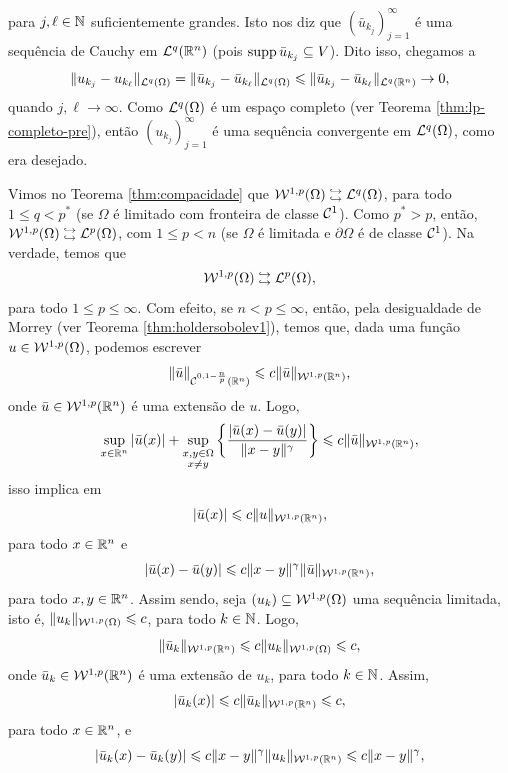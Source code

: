 \begin{prf}
\[    \]
    para $j, \ell \in \mathbb{N}$ suficientemente grandes.
    Isto nos diz que $(\bar u_{k_j})_{j=1}^\infty$ é uma sequência de Cauchy em $\mathcal{L}^q(\mathbb{R}^n)$ (pois $\mathrm{supp}\, \bar u_{k_j} \subseteq V$).
    Dito isso, chegamos a
    \[
        \Vert u_{k_j} - u_{k_\ell} \Vert_{\mathcal{L}^q(\Omega)} = \Vert \bar u_{k_j} - \bar u_{k_\ell} \Vert_{\mathcal{L}^q(\Omega)} \leqslant \Vert \bar u_{k_j} - \bar u_{k_\ell} \Vert_{\mathcal{L}^q(\mathbb{R}^n)} \to 0,
    \]
    quando $j,\ell \to \infty$.
    Como $\mathcal{L}^q(\Omega)$ é um espaço completo (ver Teorema \ref{thm:lp-completo-pre}), então $(u_{k_j})_{j=1}^\infty$ é uma sequência convergente em $\mathcal{L}^q(\Omega)$, como era desejado.
\end{prf}

\obs Vimos no Teorema \ref{thm:compacidade} que $\mathcal{W}^{1,p}(\Omega) \;\substack{\hookrightarrow \\ \hookrightarrow}\; \mathcal{L}^q(\Omega)$, para todo $1 \leqslant q < p^*$ (se $\Omega$ é limitado com fronteira de classe $\mathcal{C}^1$). Como $p^* > p$, então, $\mathcal{W}^{1,p}(\Omega) \;\substack{\hookrightarrow \\ \hookrightarrow}\; \mathcal{L}^p(\Omega)$, com $1 \leqslant p < n$ (se $\Omega$ é limitada e $\partial\Omega$ é de classe $\mathcal{C}^1$).
Na verdade, temos que
\[
    \mathcal{W}^{1,p}(\Omega) \;\substack{\hookrightarrow \\ \hookrightarrow}\; \mathcal{L}^p(\Omega),
\]
para todo $1 \leqslant p \leqslant \infty$.
Com efeito, se $n < p \leqslant \infty$, então, pela desigualdade de Morrey (ver Teorema \ref{thm:holdersobolev1}), temos que, dada uma função $u \in \mathcal{W}^{1,p}(\Omega)$, podemos escrever
\[
    \Vert \bar u \Vert_{\mathcal{C}^{0,1-\frac{n}{p}}(\mathbb{R}^n)} \leqslant c \Vert \bar u \Vert_{\mathcal{W}^{1,p}(\mathbb{R}^n)},
\]
onde $\bar u \in \mathcal{W}^{1,p}(\mathbb{R}^n)$ é uma extensão de $u$. Logo,
\[
    \sup_{x \in \mathbb{R}^n} |\bar u(x)| + \sup_{\substack{x,y \in \Omega\\x \neq y}} \left\{ \frac{|\bar u(x) - \bar u(y)|}{\Vert x - y \Vert^\gamma} \right\} \leqslant c \Vert \bar u \Vert_{\mathcal{W}^{1,p}(\mathbb{R}^n)},
\]
isso implica em
\[
    |\bar u(x)| \leqslant c \Vert u \Vert_{\mathcal{W}^{1,p}(\mathbb{R}^n)},
\]
para todo $x \in \mathbb{R}^n$ e
\[
    |\bar u(x) - \bar u(y)| \leqslant c \Vert x - y \Vert^\gamma \Vert \bar u \Vert_{\mathcal{W}^{1,p}(\mathbb{R}^n)},
\]
para todo $x, y \in \mathbb{R}^n$.
Assim sendo, seja $(u_k) \subseteq \mathcal{W}^{1,p}(\Omega)$ uma sequência limitada, isto é, $\Vert u_k \Vert_{\mathcal{W}^{1,p}(\Omega)} \leqslant c$, para todo $k \in \mathbb{N}$.
Logo,
\[
    \Vert \bar u_k \Vert_{\mathcal{W}^{1,p}(\mathbb{R}^n)} \leqslant c \Vert u_k \Vert_{\mathcal{W}^{1,p}(\Omega)} \leqslant c,
\]
onde $\bar u_k \in \mathcal{W}^{1,p}(\mathbb{R}^n)$ é uma extensão de $u_k$, para todo $k \in \mathbb{N}$.
Assim,
\[
    |\bar u_k(x)| \leqslant c \Vert \bar u_k \Vert_{\mathcal{W}^{1,p}(\mathbb{R}^n)} \leqslant c,
\]
para todo $x \in \mathbb{R}^n$, e
\[
    | \bar u_k(x) - \bar u_k(y)| \leqslant c \Vert x - y \Vert^\gamma \Vert u_k \Vert_{\mathcal{W}^{1,p}(\mathbb{R}^n)} \leqslant c \Vert x - y \Vert^{\gamma},
\]
